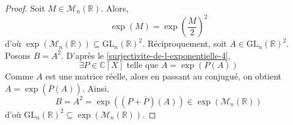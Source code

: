 	\begin{proof}
		Soit $M \in \mathcal{M}_n(\mathbb{R})$. Alors,
		\[ \exp(M) = \exp \left( \frac{M}{2} \right)^2 \]
		d'où $\exp(\mathcal{M}_n(\mathbb{R})) \subseteq \mathrm{GL}_n(\mathbb{R})^2$. Réciproquement, soit $A \in \mathrm{GL}_n(\mathbb{R})^2$. Posons $B = A^2$. D'après le \cref{surjectivite-de-l-exponentielle-4},
		\[ \exists P \in \mathbb{C}[X] \text{ telle que } A = \exp(P(A)) \]
		Comme $A$ est une matrice réelle, alors en passant au conjugué, on obtient $A = \exp(\overline{P}(A))$. Ainsi,
		\[ B = A^2 = \exp((P + \overline{P})(A)) \in \exp(\mathcal{M}_n(\mathbb{R})) \]
		d'où $\mathrm{GL}_n(\mathbb{R})^2 \subseteq \exp(\mathcal{M}_n(\mathbb{R}))$.
	\end{proof}

